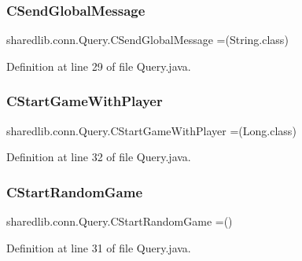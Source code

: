 \subsubsection{\texorpdfstring{C\+Send\+Global\+Message}{CSendGlobalMessage}}
{\footnotesize\ttfamily sharedlib.\+conn.\+Query.\+C\+Send\+Global\+Message =(String.\+class)}



Definition at line 29 of file Query.\+java.

\hypertarget{enumsharedlib_1_1conn_1_1_query_afd7008679cab67b543ca7a83d1538c95}{}\label{enumsharedlib_1_1conn_1_1_query_afd7008679cab67b543ca7a83d1538c95} 
\subsubsection{\texorpdfstring{C\+Start\+Game\+With\+Player}{CStartGameWithPlayer}}
{\footnotesize\ttfamily sharedlib.\+conn.\+Query.\+C\+Start\+Game\+With\+Player =(Long.\+class)}



Definition at line 32 of file Query.\+java.

\hypertarget{enumsharedlib_1_1conn_1_1_query_aac53d6c92650e86009f75319e808d02b}{}\label{enumsharedlib_1_1conn_1_1_query_aac53d6c92650e86009f75319e808d02b} 
\subsubsection{\texorpdfstring{C\+Start\+Random\+Game}{CStartRandomGame}}
{\footnotesize\ttfamily sharedlib.\+conn.\+Query.\+C\+Start\+Random\+Game =()}



Definition at line 31 of file Query.\+java.

\hypertarget{enumsharedlib_1_1conn_1_1_query_a45b6f1768f92f9e9db98221c80217ebb}{}\label{enumsharedlib_1_1conn_1_1_query_a45b6f1768f92f9e9db98221c80217ebb} 
